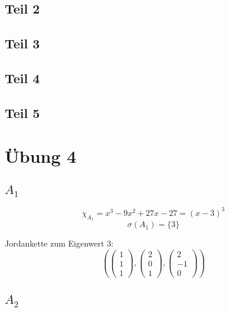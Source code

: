 \documentclass[10pt,a4paper]{article}
\begin{document}
\subsection*{Teil 2}

\subsection*{Teil 3}

\subsection*{Teil 4}

\subsection*{Teil 5}

\section*{Übung 4}

\subsection*{$A_{1}$}

\begin{equation}
\chi_{A_{1}} = x^{3} - 9x^{2} + 27x - 27 = (x - 3)^{3}
\end{equation}
\begin{equation}
\sigma(A_{1}) = \{3\}
\end{equation}

Jordankette zum Eigenwert $3$:
\begin{equation}
\left(
\begin{pmatrix}
1\\1\\1
\end{pmatrix},
\begin{pmatrix}
2\\0\\1
\end{pmatrix},
\begin{pmatrix}
2\\-1\\0
\end{pmatrix}
\right)
\end{equation}

\subsection*{$A_{2}$}
\end{document}
